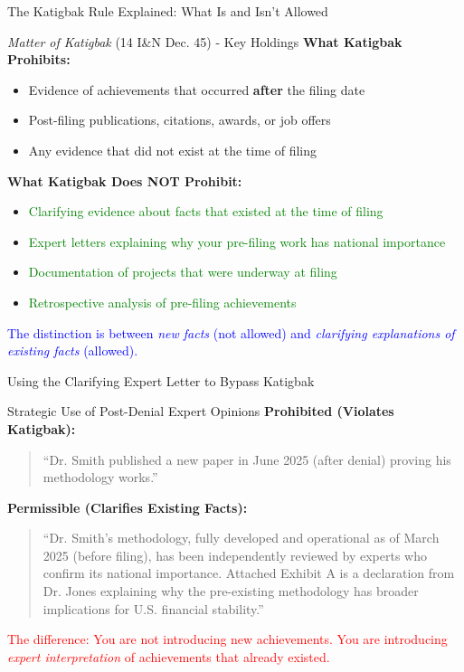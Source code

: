 \documentclass[11pt]{beamer}
\begin{document}
	\begin{frame}{The Katigbak Rule Explained: What Is and Isn't Allowed}
		\scriptsize
		\begin{block}{\textit{Matter of Katigbak} (14 I\&N Dec. 45) - Key Holdings}
			\textbf{What Katigbak Prohibits:}
			\begin{itemize}
				\item Evidence of achievements that occurred \textbf{after} the filing date
				\item Post-filing publications, citations, awards, or job offers
				\item Any evidence that did not exist at the time of filing
			\end{itemize}
			\textbf{What Katigbak Does NOT Prohibit:}
			\begin{itemize}
				\item \textcolor{green}{Clarifying evidence about facts that existed at the time of filing}
				\item \textcolor{green}{Expert letters explaining why your pre-filing work has national importance}
				\item \textcolor{green}{Documentation of projects that were underway at filing}
				\item \textcolor{green}{Retrospective analysis of pre-filing achievements}
			\end{itemize}
			\textcolor{blue}{The distinction is between \textit{new facts} (not allowed) and \textit{clarifying explanations of existing facts} (allowed).}
		\end{block}
	\end{frame}
	
	\begin{frame}{Using the Clarifying Expert Letter to Bypass Katigbak}
		\scriptsize
		\begin{block}{Strategic Use of Post-Denial Expert Opinions}
			\textbf{Prohibited (Violates Katigbak):}
			\begin{quote}
				``Dr. Smith published a new paper in June 2025 (after denial) proving his methodology works.''
			\end{quote}
			\textbf{Permissible (Clarifies Existing Facts):}
			\begin{quote}
				``Dr. Smith's methodology, fully developed and operational as of March 2025 (before filing), has been independently reviewed by experts who confirm its national importance. Attached Exhibit A is a declaration from Dr. Jones explaining why the pre-existing methodology has broader implications for U.S. financial stability.''
			\end{quote}
			\textcolor{red}{The difference: You are not introducing new achievements. You are introducing \textit{expert interpretation} of achievements that already existed.}
		\end{block}
	\end{frame}
	
\end{document}
